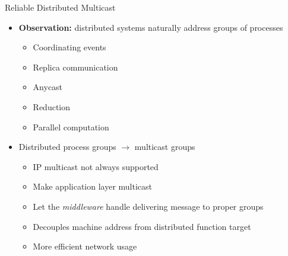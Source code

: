 \documentclass[pdftex]{beamer}
\begin{document}
\begin{frame}{Reliable Distributed Multicast}
\begin{itemize}
	\item \textbf{Observation:} distributed systems naturally address groups of processes
	\begin{itemize}
		\item Coordinating events
		\item Replica communication
		\item Anycast
		\item Reduction
		\item Parallel computation
	\end{itemize}
	
	\item Distributed process groups $\rightarrow$ multicast groups
	\begin{itemize}
		\item IP multicast not always supported
		\item Make application layer multicast
		\item Let the \emph{middleware} handle delivering message to proper groups
		\item Decouples machine address from distributed function target
		\item More efficient network usage
	\end{itemize}
\end{itemize}
\end{frame}



\end{document}
